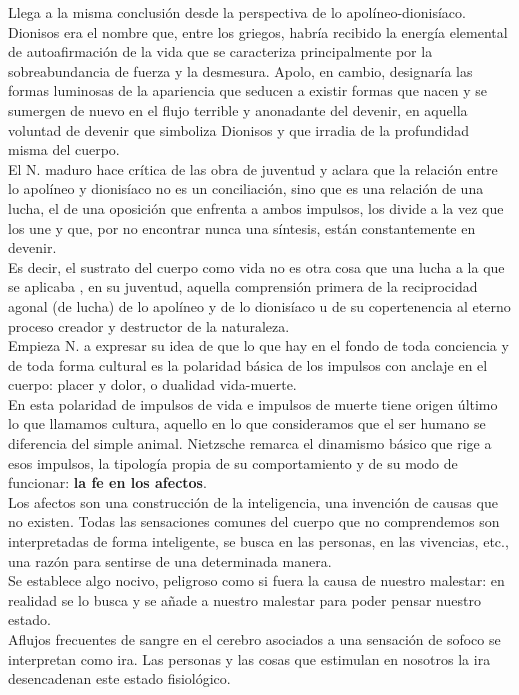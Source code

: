 \documentclass[a4paper, 10pt, twocolumn, spanish]{article}
\begin{document}
Llega a la misma conclusión desde la perspectiva de lo
apolíneo-dionisíaco. Dionisos era el nombre que, entre los griegos,
habría recibido la energía elemental de autoafirmación de la vida que
se caracteriza principalmente por la sobreabundancia de fuerza y la
desmesura. Apolo, en cambio, designaría las formas luminosas de la
apariencia que seducen a existir formas que nacen y se sumergen de
nuevo en el flujo terrible y anonadante del devenir, en aquella
voluntad de devenir que simboliza Dionisos y que irradia de la
profundidad misma del cuerpo.\\[0pt]
El N. maduro hace crítica de las obra de juventud y aclara que la
relación entre lo apolíneo y dionisíaco no es un conciliación, sino
que es una relación de una lucha, el de una oposición que enfrenta a
ambos impulsos, los divide a la vez que los une y que, por no
encontrar nunca una síntesis, están constantemente en devenir.\\[0pt]
Es decir, el sustrato del cuerpo como vida no es otra cosa que una
lucha a la que se aplicaba , en su juventud, aquella comprensión
primera de la reciprocidad agonal (de lucha) de lo apolíneo y de lo
dionisíaco u de su copertenencia al eterno proceso creador y
destructor de la naturaleza.\\[0pt]

Empieza N. a expresar su idea de que lo que hay en el fondo de toda
conciencia y de toda forma cultural es la polaridad básica de los
impulsos con anclaje en el cuerpo: placer y dolor, o dualidad
vida-muerte.\\[0pt]
En esta polaridad de impulsos de vida e impulsos de muerte tiene
origen último lo que llamamos cultura, aquello en lo que consideramos
que el ser humano se diferencia del simple animal. Nietzsche remarca
el dinamismo básico que rige a esos impulsos, la tipología propia de
su comportamiento y de su modo de funcionar: \textbf{la fe en los afectos}.\\[0pt]

Los afectos son una construcción de la inteligencia, una invención de
causas que no existen. Todas las sensaciones comunes del cuerpo que no
comprendemos son interpretadas de forma inteligente, se busca en las
personas, en las vivencias, etc., una razón para sentirse de una
determinada manera.\\[0pt]
Se establece algo nocivo, peligroso como si fuera la causa de nuestro
malestar: en realidad se lo busca y se añade a nuestro malestar para
poder pensar nuestro estado.\\[0pt]
Aflujos frecuentes de sangre en el cerebro asociados a una sensación
de sofoco se interpretan como ira. Las personas y las cosas que
estimulan en nosotros la ira desencadenan este estado fisiológico.\\[0pt]
\end{document}
